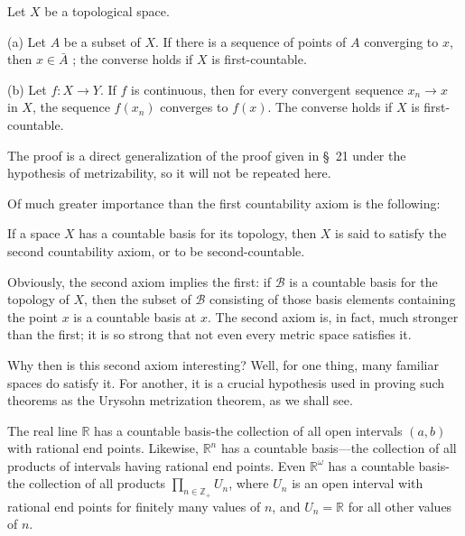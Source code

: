 \begin{theorem}
\label{thm:\thetheorem}
 Let \(X\) be a topological space.

(a) Let \(A\) be a subset of \(X\). If there is a sequence of points of \(A\) converging to \(x\), then \(x \in \bar{A}\) ; the converse holds if \(X\) is first-countable.

(b) Let \(f : X \rightarrow Y\). If \(f\) is continuous, then for every convergent sequence \(x_{n} \rightarrow x\) in \(X\), the sequence \(f( x_{n})\) converges to \(f(x)\). The converse holds if \(X\) is first-countable.

\end{theorem}

The proof is a direct generalization of the proof given in \S\ 21 under the hypothesis of metrizability, so it will not be repeated here.

Of much greater importance than the first countability axiom is the following:

\begin{definition}
 If a space \(X\) has a countable basis for its topology, then \(X\) is said to satisfy the second countability axiom, or to be second-countable.
\end{definition}

Obviously, the second axiom implies the first: if \(\mathcal{B}\) is a countable basis for the topology of \(X\), then the subset of \(\mathcal{B}\) consisting of those basis elements containing the point \(x\) is a countable basis at \(x\). The second axiom is, in fact, much stronger than the first; it is so strong that not even every metric space satisfies it.

Why then is this second axiom interesting? Well, for one thing, many familiar spaces do satisfy it. For another, it is a crucial hypothesis used in proving such theorems as the Urysohn metrization theorem, as we shall see.

\begin{centeredblock}
\begin{example}
\label{ex:\thesection.\theexample}
 The real line \(\mathbb{R}\) has a countable basis-the collection of all open intervals \((a, b)\) with rational end points. Likewise, \(\mathbb{R}^{n}\) has a countable basis—the collection of all products of intervals having rational end points. Even \(\mathbb{R}^{\omega }\) has a countable basis-the collection of all products \(\mathop{\prod }\limits_{{n \in {\mathbb{Z}}_{ + }}}U_{n}\), where \(U_{n}\) is an open interval with rational end points for finitely many values of \(n\), and \(U_{n} = \mathbb{R}\) for all other values of \(n\).
\end{example}
\end{centeredblock}

